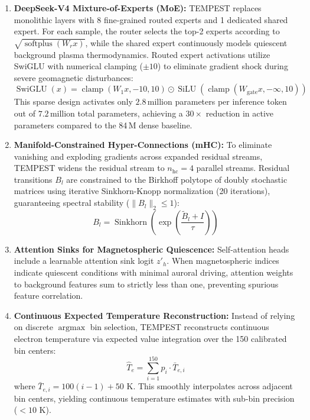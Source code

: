 \documentclass{agujournal2019}
\begin{document}
\begin{enumerate}
    \item \textbf{DeepSeek-V4 Mixture-of-Experts (MoE):} TEMPEST replaces monolithic layers with 8 fine-grained routed experts and 1 dedicated shared expert. For each sample, the router selects the top-2 experts according to $\sqrt{\operatorname{softplus}(W_r x)}$, while the shared expert continuously models quiescent background plasma thermodynamics. Routed expert activations utilize SwiGLU with numerical clamping ($\pm 10$) to eliminate gradient shock during severe geomagnetic disturbances:
    \begin{equation}
    \operatorname{SwiGLU}(x) = \operatorname{clamp}(W_1 x, -10, 10) \odot \operatorname{SiLU}(\operatorname{clamp}(W_{\text{gate}} x, -\infty, 10))
    \end{equation}
    This sparse design activates only $2.8$\,million parameters per inference token out of $7.2$\,million total parameters, achieving a $30\times$ reduction in active parameters compared to the 84\,M dense baseline.

    \item \textbf{Manifold-Constrained Hyper-Connections (mHC):} To eliminate vanishing and exploding gradients across expanded residual streams, TEMPEST widens the residual stream to $n_{\text{hc}} = 4$ parallel streams. Residual transitions $B_l$ are constrained to the Birkhoff polytope of doubly stochastic matrices using iterative Sinkhorn-Knopp normalization (20 iterations), guaranteeing spectral stability ($\|B_l\|_2 \le 1$):
    \begin{equation}
    B_l = \operatorname{Sinkhorn}\left( \exp\left( \frac{\tilde{B}_l + I}{\tau} \right) \right)
    \end{equation}

    \item \textbf{Attention Sinks for Magnetospheric Quiescence:} Self-attention heads include a learnable attention sink logit $z'_h$. When magnetospheric indices indicate quiescent conditions with minimal auroral driving, attention weights to background features sum to strictly less than one, preventing spurious feature correlation.

    \item \textbf{Continuous Expected Temperature Reconstruction:} Instead of relying on discrete $\operatorname{argmax}$ bin selection, TEMPEST reconstructs continuous electron temperature via expected value integration over the 150 calibrated bin centers:
    \begin{equation}
    \hat{T}_e = \sum_{i=1}^{150} p_i \cdot \bar{T}_{e,i}
    \end{equation}
    where $\bar{T}_{e,i} = 100(i - 1) + 50\text{ K}$. This smoothly interpolates across adjacent bin centers, yielding continuous temperature estimates with sub-bin precision ($< 10\text{ K}$).


\end{enumerate}
\end{document}
